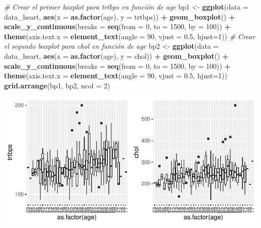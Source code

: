 \documentclass[
]{article}
\newenvironment{Shaded}{\begin{snugshade}}{\end{snugshade}}
\newcommand{\AttributeTok}[1]{\textcolor[rgb]{0.13,0.29,0.53}{#1}}
\newcommand{\CommentTok}[1]{\textcolor[rgb]{0.56,0.35,0.01}{\textit{#1}}}
\newcommand{\DecValTok}[1]{\textcolor[rgb]{0.00,0.00,0.81}{#1}}
\newcommand{\FloatTok}[1]{\textcolor[rgb]{0.00,0.00,0.81}{#1}}
\newcommand{\FunctionTok}[1]{\textcolor[rgb]{0.13,0.29,0.53}{\textbf{#1}}}
\newcommand{\NormalTok}[1]{#1}
\newcommand{\OtherTok}[1]{\textcolor[rgb]{0.56,0.35,0.01}{#1}}
\newcommand{\SpecialCharTok}[1]{\textcolor[rgb]{0.81,0.36,0.00}{\textbf{#1}}}
\begin{document}
\begin{Shaded}
\begin{Highlighting}[]
\CommentTok{\# Crear el primer boxplot para \textquotesingle{}trtbps\textquotesingle{} en función de \textquotesingle{}age\textquotesingle{}}
\NormalTok{bp1 }\OtherTok{\textless{}{-}} \FunctionTok{ggplot}\NormalTok{(}\AttributeTok{data =}\NormalTok{ data\_heart, }\FunctionTok{aes}\NormalTok{(}\AttributeTok{x =} \FunctionTok{as.factor}\NormalTok{(age), }\AttributeTok{y =}\NormalTok{ trtbps)) }\SpecialCharTok{+} 
  \FunctionTok{geom\_boxplot}\NormalTok{() }\SpecialCharTok{+} \FunctionTok{scale\_y\_continuous}\NormalTok{(}\AttributeTok{breaks =} \FunctionTok{seq}\NormalTok{(}\AttributeTok{from =} \DecValTok{0}\NormalTok{, }\AttributeTok{to =} \DecValTok{1500}\NormalTok{, }\AttributeTok{by =} \DecValTok{100}\NormalTok{)) }\SpecialCharTok{+}
  \FunctionTok{theme}\NormalTok{(}\AttributeTok{axis.text.x =} \FunctionTok{element\_text}\NormalTok{(}\AttributeTok{angle =} \DecValTok{90}\NormalTok{, }\AttributeTok{vjust =} \FloatTok{0.5}\NormalTok{, }\AttributeTok{hjust=}\DecValTok{1}\NormalTok{))}
\CommentTok{\# Crear el segundo boxplot para \textquotesingle{}chol\textquotesingle{} en función de \textquotesingle{}age\textquotesingle{}}
\NormalTok{bp2 }\OtherTok{\textless{}{-}} \FunctionTok{ggplot}\NormalTok{(}\AttributeTok{data =}\NormalTok{ data\_heart, }\FunctionTok{aes}\NormalTok{(}\AttributeTok{x =} \FunctionTok{as.factor}\NormalTok{(age), }\AttributeTok{y =}\NormalTok{ chol)) }\SpecialCharTok{+} 
  \FunctionTok{geom\_boxplot}\NormalTok{() }\SpecialCharTok{+} \FunctionTok{scale\_y\_continuous}\NormalTok{(}\AttributeTok{breaks =} \FunctionTok{seq}\NormalTok{(}\AttributeTok{from =} \DecValTok{0}\NormalTok{, }\AttributeTok{to =} \DecValTok{1500}\NormalTok{, }\AttributeTok{by =} \DecValTok{100}\NormalTok{)) }\SpecialCharTok{+}
  \FunctionTok{theme}\NormalTok{(}\AttributeTok{axis.text.x =} \FunctionTok{element\_text}\NormalTok{(}\AttributeTok{angle =} \DecValTok{90}\NormalTok{, }\AttributeTok{vjust =} \FloatTok{0.5}\NormalTok{, }\AttributeTok{hjust=}\DecValTok{1}\NormalTok{))}
\FunctionTok{grid.arrange}\NormalTok{(bp1, bp2, }\AttributeTok{ncol =} \DecValTok{2}\NormalTok{)}
\end{Highlighting}
\end{Shaded}

\includegraphics{coyolaf_ChristianOyola-PRA2_files/figure-latex/unnamed-chunk-7-1.pdf}
\end{document}
